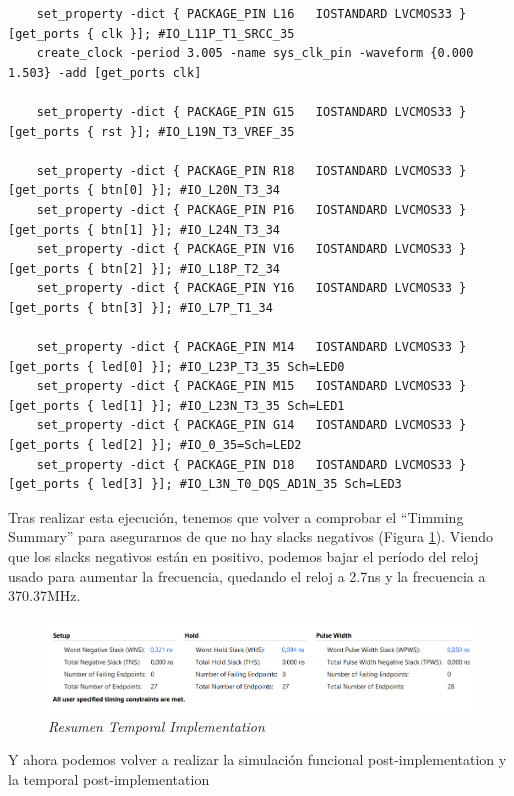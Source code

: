\begin{lstlisting}
    set_property -dict { PACKAGE_PIN L16   IOSTANDARD LVCMOS33 } [get_ports { clk }]; #IO_L11P_T1_SRCC_35
    create_clock -period 3.005 -name sys_clk_pin -waveform {0.000 1.503} -add [get_ports clk]

    set_property -dict { PACKAGE_PIN G15   IOSTANDARD LVCMOS33 } [get_ports { rst }]; #IO_L19N_T3_VREF_35

    set_property -dict { PACKAGE_PIN R18   IOSTANDARD LVCMOS33 } [get_ports { btn[0] }]; #IO_L20N_T3_34 
    set_property -dict { PACKAGE_PIN P16   IOSTANDARD LVCMOS33 } [get_ports { btn[1] }]; #IO_L24N_T3_34 
    set_property -dict { PACKAGE_PIN V16   IOSTANDARD LVCMOS33 } [get_ports { btn[2] }]; #IO_L18P_T2_34 
    set_property -dict { PACKAGE_PIN Y16   IOSTANDARD LVCMOS33 } [get_ports { btn[3] }]; #IO_L7P_T1_34 

    set_property -dict { PACKAGE_PIN M14   IOSTANDARD LVCMOS33 } [get_ports { led[0] }]; #IO_L23P_T3_35 Sch=LED0
    set_property -dict { PACKAGE_PIN M15   IOSTANDARD LVCMOS33 } [get_ports { led[1] }]; #IO_L23N_T3_35 Sch=LED1
    set_property -dict { PACKAGE_PIN G14   IOSTANDARD LVCMOS33 } [get_ports { led[2] }]; #IO_0_35=Sch=LED2
    set_property -dict { PACKAGE_PIN D18   IOSTANDARD LVCMOS33 } [get_ports { led[3] }]; #IO_L3N_T0_DQS_AD1N_35 Sch=LED3
\end{lstlisting}

Tras realizar esta ejecución, tenemos que volver a comprobar el ``Timming Summary'' para asegurarnos de que no hay slacks negativos (Figura \ref{analisis2}). Viendo 
que los slacks negativos están en positivo, podemos bajar el período del reloj usado para aumentar la frecuencia, quedando el reloj a 2.7ns y la frecuencia a 
370.37MHz.

\begin{figure}[H]
    \centering
    \includegraphics[width = 1\textwidth]{imagenes/analisis2.png}
    \caption{\textit{Resumen Temporal Implementation}}\label{analisis2}
\end{figure}

Y ahora podemos volver a realizar la simulación funcional post-implementation y la temporal post-implementation

